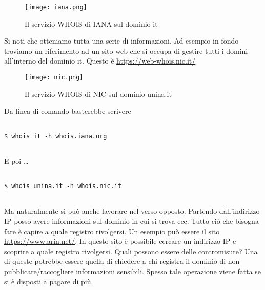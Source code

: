 \documentclass[14pt]{extreport}
\begin{document}
\begin{figure}[H]
    \centering
    \texttt{[image: iana.png]}
    \caption{Il servizio WHOIS di IANA sul dominio it}
\end{figure}

Si noti che otteniamo tutta una serie di informazioni. Ad esempio in fondo troviamo un riferimento ad un sito web che si occupa di gestire tutti i domini all'interno del dominio it. Questo è \url{https://web-whois.nic.it/}

\begin{figure}[H]
    \centering
    \texttt{[image: nic.png]}
    \caption{Il servizio WHOIS di NIC sul dominio unina.it}
\end{figure}


Da linea di comando basterebbe scrivere

\vspace{5pt}

{
\small
\begin{tcolorbox}

\begin{verbatim}

$ whois it -h whois.iana.org
  
\end{verbatim}

\end{tcolorbox}
}

\vspace{5pt}

E poi \ldots

\vspace{5pt}

{
\small
\begin{tcolorbox}

\begin{verbatim}

$ whois unina.it -h whois.nic.it
  
\end{verbatim}

\end{tcolorbox}
}

\vspace{5pt}

Ma naturalmente si può anche lavorare nel verso opposto. Partendo dall'indirizzo IP posso avere informazioni sul dominio in cui si trova ecc.
Tutto ciò che bisogna fare è capire a quale registro rivolgersi. Un esempio può essere il sito \url{https://www.arin.net/}. In questo sito è possibile cercare un indirizzo IP e scoprire a quale registro rivolgersi.
Quali possono essere delle contromisure? Una di queste potrebbe essere quella di chiedere a chi registra il dominio di non pubblicare/raccogliere informazioni sensibili. Spesso tale operazione viene fatta se si è disposti a pagare di più.
\end{document}
